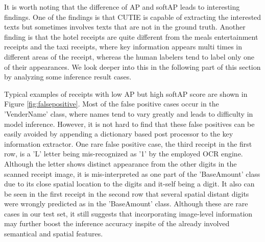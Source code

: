 \documentclass[10pt,twocolumn,letterpaper]{article}
\begin{document}
It is worth noting that the difference of AP and softAP leads to interesting findings. One of the findings is that CUTIE is capable of extracting the interested texts but sometimes involves texts that are not in the ground truth. Another finding is that the hotel receipts are quite different from the meals entertainment receipts and the taxi receipts, where key information appears multi times in different areas of the receipt, whereas the human labelers tend to label only one of their appearances. We look deeper into this in the following part of this section by analyzing some inference result cases.

Typical examples of receipts with low AP but high softAP score are shown in Figure \ref{fig:falsepositive}. Most of the false positive cases occur in the 'VenderName' class, where names tend to vary greatly and leads to difficulty in model inference. However, it is not hard to find that these false positives can be easily avoided by appending a dictionary based post processor to the key information extractor. One rare false positive case, the third receipt in the first row, is a 'L' letter being mis-recognized as '1' by the employed OCR engine. Although the letter shows distinct appearance from the other digits in the scanned receipt image, it is mis-interpreted as one part of the 'BaseAmount' class due to its close spatial location to the digits and it-self being a digit. It also can be seen in the first receipt in the second row that several spatial distant digits were wrongly predicted as in the 'BaseAmount' class. Although these are rare cases in our test set, it still suggests that incorporating image-level information may further boost the inference accuracy inspite of the already involved semantical and spatial features. 
\end{document}
